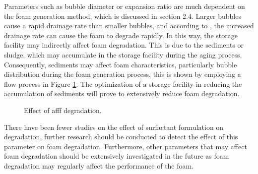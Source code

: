 Parameters such as bubble diameter or expansion ratio are much dependent on the foam generation method, which is discussed in section 2.4. Larger bubbles cause a rapid drainage rate than smaller bubbles, and according to \cite{hinnant2017influence}, the increased drainage rate can cause the foam to degrade rapidly. In this way, the storage facility may indirectly affect foam degradation. This is due to the sediments or sludge, which may accumulate in the storage facility during the aging process. Consequently, sediments may affect foam characteristics, particularly bubble distribution during the foam generation process, this is shown by employing a flow process in Figure \ref{ch2:figure:effect}. The optimization of a storage facility in reducing the accumulation of sediments will prove to extensively reduce foam degradation.

\begin{figure}[H]

\centering
\begin{adjustbox}{center}
\end{adjustbox}

\caption{Effect of \acrshort{afff} degradation.}
\label{ch2:figure:effect}
\end{figure}

There have been fewer studies on the effect of surfactant formulation on degradation, further research should be conducted to detect the effect of this parameter on foam degradation. Furthermore, other parameters that may affect foam degradation should be extensively investigated in the future as foam degradation may regularly affect the performance of the foam.

